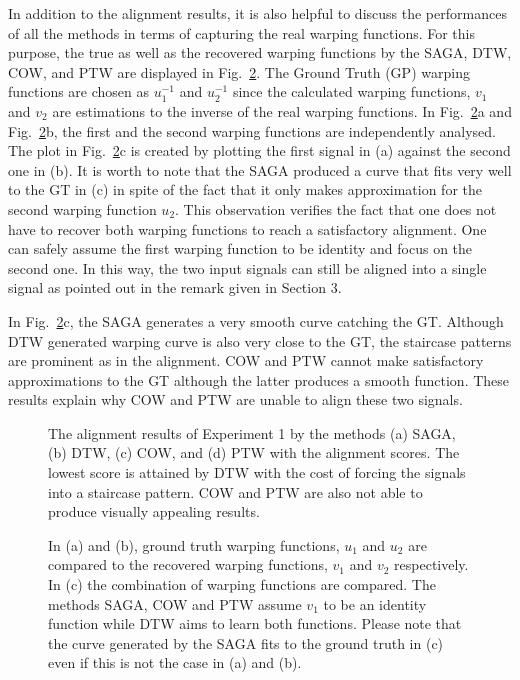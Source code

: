 \documentclass[number,1p,12pt]{elsarticle}
\begin{document}
In addition to the alignment results, it is also helpful to discuss the performances of all the methods in terms of capturing the real warping functions. For this purpose, the true as well as the recovered warping functions by the SAGA, DTW, COW, and PTW are displayed in Fig.~\ref{Figure05}. The Ground Truth (GP) warping functions are chosen as $u_1^{-1}$ and $u_2^{-1}$ since the calculated warping functions, $v_1$ and $v_2$ are estimations to the inverse of the real warping functions.  In Fig.~\ref{Figure05}a and Fig.~\ref{Figure05}b, the first and the second warping functions are independently analysed. The plot in Fig.~\ref{Figure05}c is created by plotting the first signal in (a) against the second one in (b). It is worth to note that the SAGA produced a curve that fits very well to the GT in (c) in spite of the fact that it only makes approximation for the second warping function $u_2$.  This observation verifies the fact that one does not have to recover both warping functions to reach a satisfactory alignment. One can safely assume the first warping function to be identity and focus on the second one. In this way, the two input signals can still be aligned into a single signal as pointed out in the remark given in Section 3. 

In Fig.~\ref{Figure05}c, the SAGA generates a very smooth curve catching the GT. Although DTW generated warping curve is also very close to the GT, the staircase patterns are prominent as in the alignment. COW and PTW cannot make satisfactory approximations to the GT although the latter produces a smooth function. These results explain why COW and PTW are unable to align these two signals.

\begin{figure}[t]
\caption{The alignment results of Experiment 1 by the methods (a) SAGA, (b) DTW, (c) COW, and (d) PTW with the alignment scores. The lowest score is attained by DTW with the cost of forcing the signals into a staircase pattern. COW and PTW are also not able to produce visually appealing results. }
\label{Figure04}
\end{figure} 

\begin{figure}
\caption{In (a) and (b), ground truth warping functions, $u_1$ and $u_2$ are compared to the recovered warping functions, $v_1$ and $v_2$ respectively. In (c) the combination of warping functions are compared. The methods SAGA, COW and PTW assume $v_1$ to be an identity function while DTW aims to learn both functions. Please note that the curve generated by the SAGA fits to the ground truth in (c) even if this is not the case in (a) and (b).}
\label{Figure05}
\end{figure}
\end{document}
